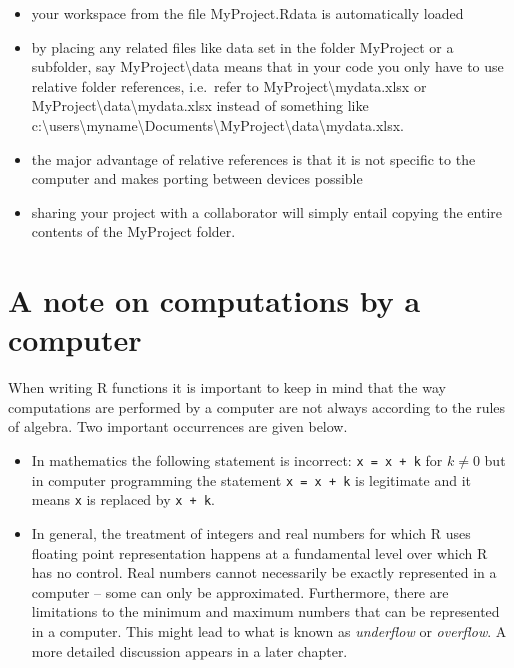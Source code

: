 \documentclass[
]{book}
\providecommand{\tightlist}{%
  \setlength{\itemsep}{0pt}\setlength{\parskip}{0pt}}
\begin{document}
\begin{itemize}
\tightlist
\item
  your {workspace} from the file {MyProject.Rdata} is automatically loaded
\item
  by placing any related files like data set in the folder {MyProject} or a subfolder, say {MyProject\textbackslash data} means that in your code you only have to use relative folder references, i.e.~refer to {MyProject\textbackslash mydata.xlsx} or {MyProject\textbackslash data\textbackslash mydata.xlsx} instead of something like {c:\textbackslash users\textbackslash myname\textbackslash Documents\textbackslash MyProject\textbackslash data\textbackslash mydata.xlsx}.
\item
  the major advantage of relative references is that it is not specific to the computer and makes porting between devices possible
\item
  sharing your project with a collaborator will simply entail copying the entire contents of the {MyProject} folder.
\end{itemize}

\section{A note on computations by a computer}\label{a-note-on-computations-by-a-computer}

When writing R functions it is important to keep in mind that the way computations are performed by a computer are not always according to the rules of algebra. Two important occurrences are given below.

\begin{itemize}
\item
  In mathematics the following statement is incorrect: \texttt{x\ =\ x\ +\ k} for \(k \neq 0\) but in computer programming the statement \texttt{x\ =\ x\ +\ k} is legitimate and it means \texttt{x} is replaced by \texttt{x\ +\ k}.
\item
  In general, the treatment of integers and real numbers for which R uses floating point representation happens at a fundamental level over which R has no control. Real numbers cannot necessarily be exactly represented in a computer -- some can only be approximated. Furthermore, there are limitations to the minimum and maximum numbers that can be represented in a computer. This might lead to what is known as \emph{{underflow}} or \emph{{overflow}}. A more detailed discussion appears in a later chapter.
\end{itemize}
\end{document}
